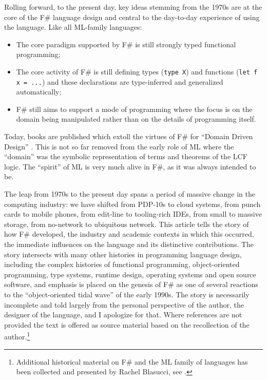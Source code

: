 \documentclass[acmsmall,screen]{acmart}
\begin{document}
Rolling forward, to the present day, key ideas stemming from the 1970s are at the core of the F\# language design
and central to the day-to-day experience of using the language.  Like all ML-family languages:
\begin{itemize}
\item The core paradigm supported by F\# is still strongly typed functional programming;
\item The core activity of F\# is still defining types (\texttt{type X}) and functions (\texttt{let f x = ...}) and these
declarations are type-inferred and generalized automatically;
\item F\# still aims to support a mode of programming where the focus is on the domain being manipulated rather than on the details of programming itself.
\end{itemize}

Today, books are published which extoll the virtues of F\# for ``Domain Driven Design'' \citep{wlaschin2018domain}.  This is not so
far removed from the early role of ML where the ``domain'' was the symbolic representation of terms and theorems of the
LCF logic. The ``spirit'' of ML is very much alive in F\#, as it was always intended to be. 

The leap from 1970s to the present day spans a period of massive change in the computing industry: we have shifted
from PDP-10s to cloud systems, from punch cards to mobile phones, from edit-line to tooling-rich IDEs, from small to
massive storage, from no-network to ubiquitous network. This article tells the story of how F\# developed, the
industry and academic contexts in which this occurred, the immediate influences on the language and its distinctive
contributions. The story intersects with many other histories in programming language design, including the complex
histories of functional programming, object-oriented programming, type systems, runtime design, operating systems and
open source software, and emphasis is placed on the genesis of F\# as one of several reactions to the ``object-oriented
tidal wave'' of the early 1990s.  The story is necessarily incomplete and told largely from the personal perspective of the
author, the designer of the language, and I apologize for that. Where references are not provided the text is offered
as source material based on the recollection of the author.\footnote{Additional historical material on F\# and the ML family of languages
has been collected and presented by Rachel Blasucci, see \citep{BlasucciFSharpHistory}.}
\end{document}
